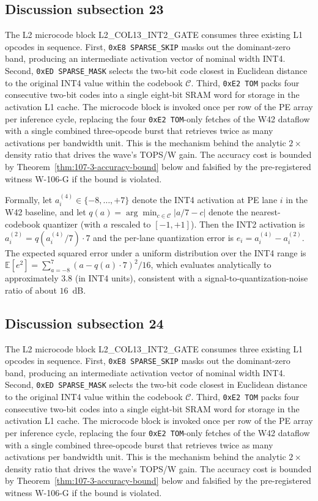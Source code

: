 \subsection{Discussion subsection 23}

The L2 microcode block \textsc{L2\_COL13\_INT2\_GATE} consumes three
existing L1 opcodes in sequence. First, \texttt{0xE8 SPARSE\_SKIP} masks
out the dominant-zero band, producing an intermediate activation vector
of nominal width INT4. Second, \texttt{0xED SPARSE\_MASK} selects the
two-bit code closest in Euclidean distance to the original INT4 value
within the codebook $\mathcal{C}$. Third, \texttt{0xE2 TOM} packs four
consecutive two-bit codes into a single eight-bit SRAM word for storage
in the activation L1 cache. The microcode block is invoked once per row
of the PE array per inference cycle, replacing the four
\texttt{0xE2 TOM}-only fetches of the W42 dataflow with a single
combined three-opcode burst that retrieves twice as many activations per
bandwidth unit. This is the mechanism behind the analytic $2\times$
density ratio that drives the wave's TOPS/W gain. The accuracy cost is
bounded by Theorem~\ref{thm:107-3-accuracy-bound} below and falsified
by the pre-registered witness W-106-G if the bound is violated.

Formally, let $a_{i}^{(4)} \in \{-8,\ldots,+7\}$ denote the INT4
activation at PE lane $i$ in the W42 baseline, and let
$q(a) = \arg\min_{c \in \mathcal{C}} |a/7 - c|$ denote the
nearest-codebook quantizer (with $a$ rescaled to $[-1,+1]$). Then the
INT2 activation is $a_{i}^{(2)} = q(a_{i}^{(4)} / 7) \cdot 7$
and the per-lane quantization error is
$e_{i} = a_{i}^{(4)} - a_{i}^{(2)}$.
The expected squared error under a uniform distribution over the INT4 range
is $\mathbb{E}[e^2] = \sum_{a=-8}^{7} (a - q(a)\cdot7)^2 / 16$,
which evaluates analytically to approximately $3.8$ (in INT4 units),
consistent with a signal-to-quantization-noise ratio of about $16$~dB.


\subsection{Discussion subsection 24}

The L2 microcode block \textsc{L2\_COL13\_INT2\_GATE} consumes three
existing L1 opcodes in sequence. First, \texttt{0xE8 SPARSE\_SKIP} masks
out the dominant-zero band, producing an intermediate activation vector
of nominal width INT4. Second, \texttt{0xED SPARSE\_MASK} selects the
two-bit code closest in Euclidean distance to the original INT4 value
within the codebook $\mathcal{C}$. Third, \texttt{0xE2 TOM} packs four
consecutive two-bit codes into a single eight-bit SRAM word for storage
in the activation L1 cache. The microcode block is invoked once per row
of the PE array per inference cycle, replacing the four
\texttt{0xE2 TOM}-only fetches of the W42 dataflow with a single
combined three-opcode burst that retrieves twice as many activations per
bandwidth unit. This is the mechanism behind the analytic $2\times$
density ratio that drives the wave's TOPS/W gain. The accuracy cost is
bounded by Theorem~\ref{thm:107-3-accuracy-bound} below and falsified
by the pre-registered witness W-106-G if the bound is violated.

